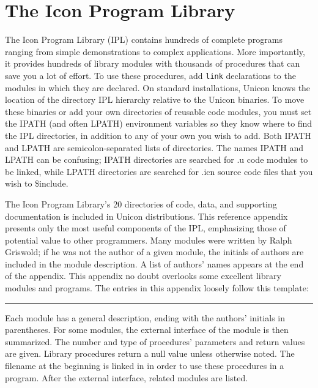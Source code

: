 \chapter{The Icon Program Library}

The Icon Program Library (IPL) contains
hundreds of complete programs ranging from simple demonstrations to
complex applications. More importantly, it provides hundreds of
library modules with thousands of procedures that can save you a lot
of effort. To use these procedures, add \texttt{link}
declarations to the modules in which they are declared. On standard
installations, Unicon knows the location of the directory IPL
hierarchy relative to the Unicon binaries. To move these binaries or
add your own directories of reusable code modules, you must set the
IPATH (and often LPATH)
environment variables so they know
where to find the IPL directories, in addition to any of your own you
wish to add. Both IPATH and LPATH are semicolon-separated lists of
directories. The names IPATH and LPATH can be confusing; IPATH
directories are searched for .u code modules to be linked,
while LPATH directories are searched for .icn
source code files that you wish to \$include.

The Icon Program Library's 20 directories of code, data, and
supporting documentation is included in Unicon
distributions. This reference appendix presents
only the most useful components of the IPL, emphasizing those of
potential value to other programmers.  Many modules were written by
Ralph Griswold; if he was not the author of a given
module, the initials of authors are included in the module
description. A list of authors' names appears at the end of the
appendix. This appendix no doubt overlooks some excellent library
modules and programs.  The entries in this appendix loosely follow
this template:

\vspace{0.25cm}\hrule{}

Each module has a general description, ending
with the authors' initials in parentheses. For some modules,
the external interface of the module is then summarized.
The number and type of procedures' parameters and
return values are given. Library procedures return a
null value unless otherwise noted. The filename at the beginning is
linked in in order to use these procedures in a
program. After the external interface, related modules
are listed.

